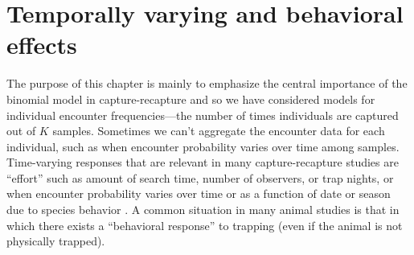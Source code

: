 \section{Temporally varying and behavioral effects}

The purpose of this chapter is mainly to emphasize the central
importance of the binomial model in capture-recapture and so we have
considered models for individual encounter frequencies---the number of
times individuals are captured out of $K$ samples.  Sometimes we can't
aggregate the encounter data for each individual, such as when
encounter probability varies over time among samples.  Time-varying
responses that are relevant in many capture-recapture studies are
``effort'' such as amount of search time, number of observers, or trap
nights, or when encounter probability varies over time or as a
function of date or season due to species behavior
\citep{kery_etal:2010}.  A common situation in many animal studies is
that in which there exists a ``behavioral response'' to trapping (even
if the animal is not physically trapped).

